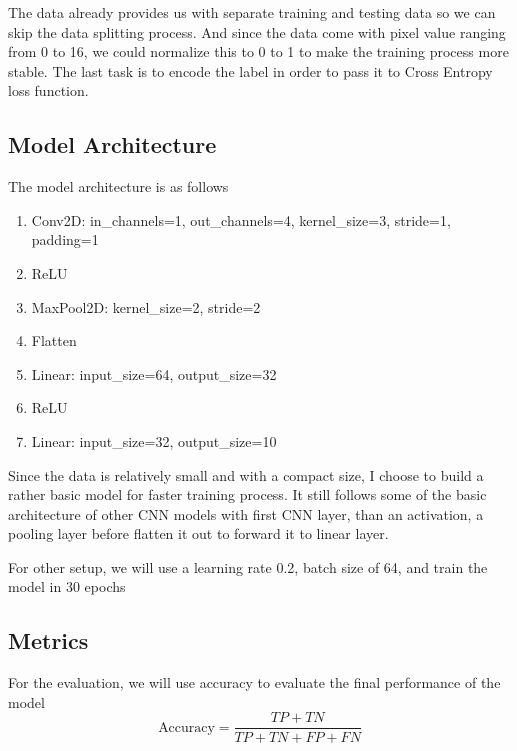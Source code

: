 \documentclass[conference]{IEEEtran}
\begin{document}
The data already provides us with separate training and testing data so we can skip the data splitting process. And since the data come with pixel value ranging from 0 to 16, we could normalize this to 0 to 1 to make the training process more stable. The last task is to encode the label in order to pass it to Cross Entropy loss function.
\subsection{Model Architecture}
The model architecture is as follows
\begin{enumerate}
    \item Conv2D: in\_channels=1, out\_channels=4, kernel\_size=3, stride=1, padding=1
    \item ReLU
    \item MaxPool2D: kernel\_size=2, stride=2
    \item Flatten
    \item Linear: input\_size=64, output\_size=32
    \item ReLU
    \item Linear: input\_size=32, output\_size=10
\end{enumerate}

Since the data is relatively small and with a compact size, I choose to build a rather basic model for faster training process. It still follows some of the basic architecture of other CNN models with first CNN layer, than an activation, a pooling layer before flatten it out to forward it to linear layer.

For other setup, we will use a learning rate 0.2, batch size of 64, and train the model in 30 epochs

\subsection{Metrics}
For the evaluation, we will use accuracy to evaluate the final performance of the model
\begin{equation}
\text{Accuracy} = \frac{TP + TN}{TP + TN + FP + FN}
\end{equation}
\end{document}
